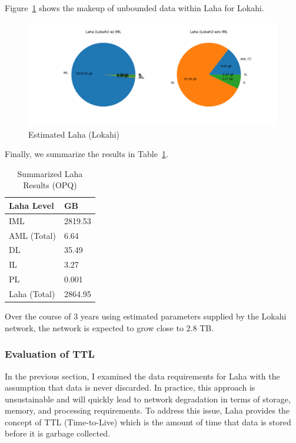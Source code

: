 Figure~\ref{fig:plot_lala_lokahi_pie} shows the makeup of unbounded data within Laha for Lokahi.

\begin{figure}[H]
	\centering
	\includegraphics[width=\linewidth]{figures/plot_laha_lokahi_pie.png}
	\caption{Estimated Laha (Lokahi)}
	\label{fig:plot_lala_lokahi_pie}
\end{figure}

Finally, we summarize the results in Table~\ref{table:summarized_laha_results_lokahi}.

\begin{table}[H]
	\centering
	\caption{Summarized Laha Results (OPQ)}
	\begin{tabularx}{\textwidth}{ll}
		\toprule
		\textbf{Laha Level} & \bm{$\mu Size$} \textbf{GB} \\
		\midrule
		IML & 2819.53 \\
		AML (Total) & 6.64  \\
		DL & 35.49  \\
		IL & 3.27  \\
		PL & 0.001  \\
		Laha (Total) & 2864.95  \\
		\bottomrule
	\end{tabularx}
	\label{table:summarized_laha_results_lokahi}
\end{table}

Over the course of 3 years using estimated parameters supplied by the Lokahi network, the network is expected to grow close to 2.8 TB.

\subsubsection{Evaluation of TTL}\label{sssec:evaluation_of_ttl}
In the previous section, I examined the data requirements for Laha with the assumption that data is never discarded. In practice, this approach is unsustainable and will quickly lead to network degradation in terms of storage, memory, and processing requirements. To address this issue, Laha provides the concept of TTL (Time-to-Live) which is the amount of time that data is stored before it is garbage collected.

